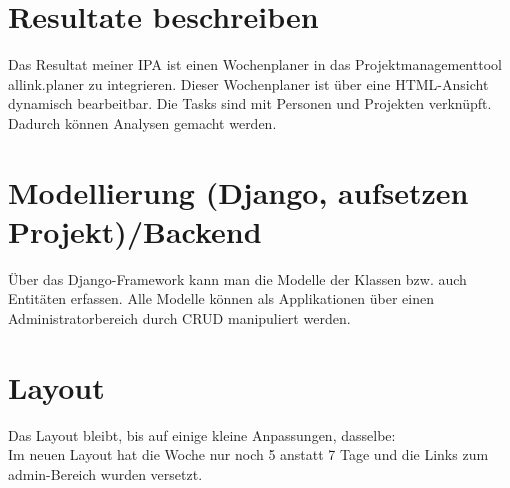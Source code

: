 \section{Resultate beschreiben}
Das Resultat meiner IPA ist einen Wochenplaner in das Projektmanagementtool allink.planer zu integrieren.
Dieser Wochenplaner ist über eine HTML-Ansicht dynamisch bearbeitbar. Die Tasks sind mit Personen und Projekten verknüpft. Dadurch können Analysen gemacht werden.
\section{Modellierung (Django, aufsetzen Projekt)/Backend }
Über das Django-Framework kann man die Modelle der Klassen bzw. auch Entitäten erfassen.
Alle Modelle können als Applikationen über einen Administratorbereich durch CRUD manipuliert werden.
\section{Layout}
Das Layout bleibt, bis auf einige kleine Anpassungen, dasselbe:\\
Im neuen Layout hat die Woche nur noch 5 anstatt 7 Tage und die Links zum admin-Bereich wurden versetzt.
